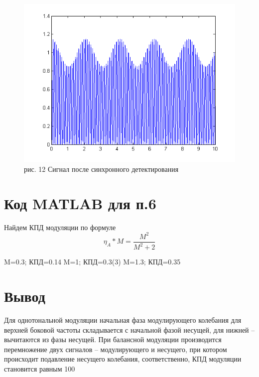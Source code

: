 \documentclass[10pt,a4paper]{report}
\begin{document}
\begin{figure}
\begin{center}
\includegraphics[angle=0, scale = 0.8]{3_1.png}\newline
рис. 12  Сигнал после синхронного детектирования\newline
\end{center}
\end{figure}
\chapter{Код MATLAB для п.6}
Найдем КПД модуляции по формуле
\begin{displaymath}
\eta_{A}*M=\frac{M^{2}}{M^{2}+2}
\end{displaymath}
\begin{center}
M=0.3; КПД=0.14\newline
M=1; КПД=0.3(3)\newline
M=1.3; КПД=0.35\newline
\end{center}
\chapter{Вывод}
Для однотональной модуляции начальная фаза модулирующего колебания для верхней боковой частоты складывается с начальной фазой несущей, для нижней – вычитаются из фазы несущей.
При балансной модуляции производится перемножение двух сигналов – модулирующего и несущего, при котором происходит подавление несущего колебания, соответственно, КПД модуляции становится равным 100%
\end{document}
